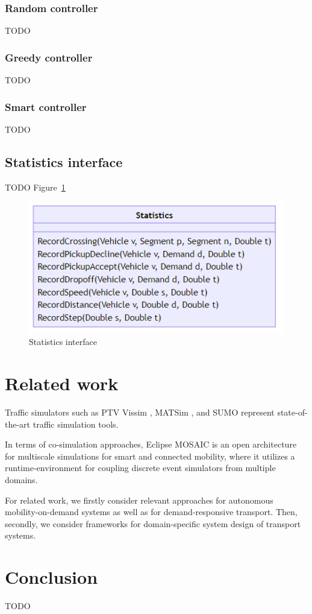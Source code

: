 \documentclass[graybox]{svmult}
\begin{document}
\subsubsection{Random controller}
TODO

\subsubsection{Greedy controller}
TODO

\subsubsection{Smart controller}
TODO

\subsection{Statistics interface}
\label{sec:statistics}
TODO Figure~\ref{fig:statistics}

\begin{figure}[htbp]
	\centering
	\includegraphics[scale=0.4]{../../diagrams/statistics/classes.png}
	\caption{Statistics interface}
	\label{fig:statistics}
\end{figure}

\newpage

\section{Related work}
\label{sec:related}

Traffic simulators such as PTV Vissim \cite{fellendorf_vissim_1994}, MATSim \cite{w_axhausen_multi-agent_2016}, and SUMO  \cite{lopez_microscopic_2018} represent state-of-the-art traffic simulation tools.

In terms of co-simulation approaches, Eclipse MOSAIC \cite{schunemann_v2x_2011, noauthor_eclipse_nodate} is an open architecture for multiscale simulations for smart and connected mobility, where it utilizes a runtime-environment for coupling discrete event simulators from multiple domains.

For related work, we firstly consider relevant approaches for autonomous mobility-on-demand systems as well as for demand-responsive transport. Then, secondly, we consider frameworks for domain-specific system design of transport systems.

\section{Conclusion}
\label{sec:con}
TODO



\end{document}
